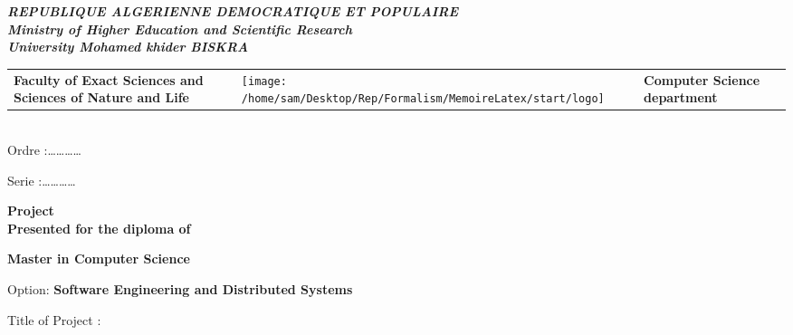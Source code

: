 \begin{titlepage}

\begin{center}
\textbf{\textsl{\large{}REPUBLIQUE ALGERIENNE DEMOCRATIQUE ET POPULAIRE}}\textbf{\textsl{\small{}}}\\
\textbf{\textsl{ Ministry of Higher Education and Scientific Research }}\textbf{\textsl{\small{}}}\\
\textbf{\textsl{  University Mohamed khider  {  \textendash{}
BISKRA}}}
\par\end{center}

\begin{tabular}{>{\centering}m{45mm}>{\centering}m{40mm}>{\centering}m{60mm}}
\centering{}\textbf{Faculty of Exact Sciences 
and Sciences of Nature and Life } & \centering
\hspace{5mm}
\texttt{[image: /home/sam/Desktop/Rep/Formalism/MemoireLatex/start/logo]} & \centering{}\textbf{Computer Science department}\tabularnewline
\end{tabular}\\


{\small{}Ordre :\dots \dots \dots \dots{} }{\small \par}

{\small{}Serie :\dots \dots \dots \dots{}}{\small \par}

\begin{center}
\textbf{Project}\\
\textbf{Presented for the diploma of }
\par\end{center}

\begin{center}
\textbf{\large{}Master in Computer Science }   
\par\end{center}

\begin{center}
Option: \textbf{Software Engineering and Distributed Systems }
\par\end{center}

\vspace*{10mm}

Title of Project :

\begin{center}
{\LARGE{}}%
\vspace*{10mm}


\end{center}
\end{titlepage}
